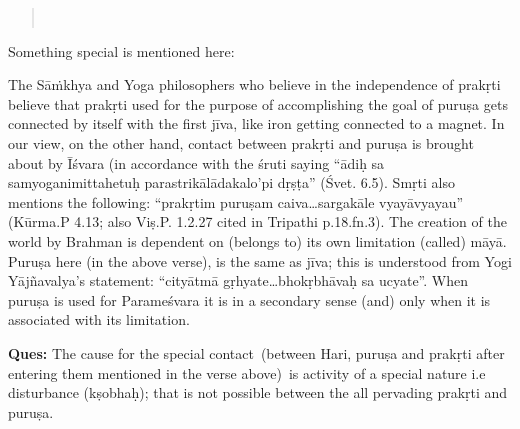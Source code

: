 \begin{verse}
\\
\end{verse}


Something special is mentioned here:

The Sāṁkhya and Yoga philosophers who believe in the independence of prakṛti believe that prakṛti used for the purpose of accomplishing the goal of puruṣa gets connected by itself with the first jīva, like iron getting connected to a magnet.  In our view, on the other hand, contact between prakṛti and puruṣa is brought about by Īśvara (in accordance with the śruti saying “ādiḥ sa samyoganimittahetuḥ parastrikālādakalo’pi dṛṣṭa” (Śvet. 6.5). Smṛti also mentions the following: “prakṛtim puruṣam caiva…sargakāle vyayāvyayau” (Kūrma.P 4.13; also Viṣ.P. 1.2.27 cited in Tripathi p.18.fn.3). The creation of the world by Brahman is dependent on (belongs to) its own limitation (called) māyā. Puruṣa here (in the above verse), is the same as jīva; this is understood from Yogi Yājñavalya’s statement: “cityātmā gṛhyate…bhokṛbhāvaḥ sa ucyate”. When puruṣa is used for Parameśvara it is in a secondary sense (and) only when it is associated with its limitation.

\textbf{Ques:} The cause for the special contact (between Hari, puruṣa and prakṛti after entering them mentioned in the verse above) is activity of a special nature i.e disturbance (kṣobhaḥ); that is not possible between the all pervading prakṛti and puruṣa.

